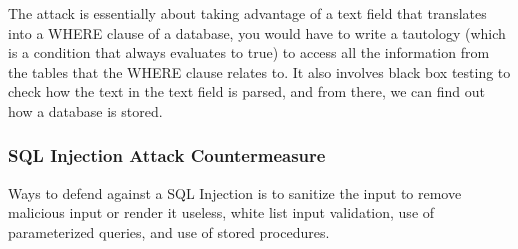 \documentclass[12pt]{article}
\begin{document}
The attack is essentially about taking advantage of a text field that translates into a WHERE clause of a database, you would have to write a tautology (which is a condition that always evaluates to true) to access all the information from the tables that the WHERE clause relates to. It also involves black box testing to check how the text in the text field is parsed, and from there, we can find out how a database is stored.

\subsubsection{SQL Injection Attack Countermeasure}

Ways to defend against a SQL Injection is to sanitize the input to remove malicious input or render it useless, white list input validation, use of parameterized queries, and use of stored procedures.
\end{document}
